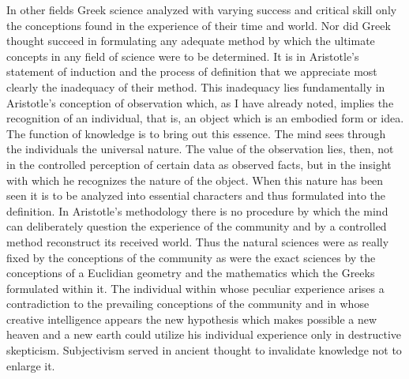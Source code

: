 \documentclass[12pt]{article}
\begin{document}
In other fields Greek science analyzed with varying
success and critical skill only the conceptions found in
the experience of their time and world. Nor did Greek
thought succeed in formulating any adequate method
by which the ultimate concepts in any field of science
were to be determined. It is in Aristotle's statement of
induction and the process of definition that we appreciate
most clearly the inadequacy of their method. This
inadequacy lies fundamentally in Aristotle's conception
of observation which, as I have already noted, implies
the recognition of an individual, that is, an object
which is an embodied form or idea. The function of
knowledge is to bring out this essence. The mind sees
through the individuals the universal nature. The
value of the observation lies, then, not in the controlled
perception of certain data as observed facts,
but in the insight with which he recognizes the nature
of the object. When this nature has been seen it is
to be analyzed into essential characters and thus
formulated into the definition. In Aristotle's methodology
there is no procedure by which the mind can
deliberately question the experience of the community
and by a controlled method reconstruct its received
world. Thus the natural sciences were as really fixed
by the conceptions of the community as were the exact
sciences by the conceptions of a Euclidian geometry
and the mathematics which the Greeks formulated
within it. The individual within whose peculiar experience
arises a contradiction to the prevailing conceptions
of the community and in whose creative
intelligence appears the new hypothesis which makes
possible a new heaven and a new earth could utilize
his individual experience only in destructive skepticism.
Subjectivism served in ancient thought to invalidate
knowledge not to enlarge it.
\end{document}
